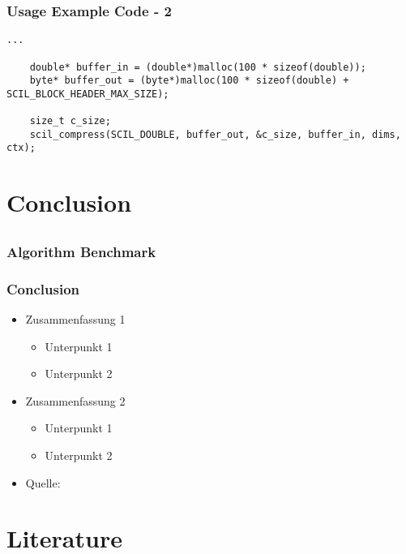 \documentclass[compress]{beamer}
\begin{document}
\begin{frame}[fragile]
	\frametitle{Usage Example Code - 2}

	\begin{lstlisting}[caption=SCIL usage example]
	...

	double* buffer_in = (double*)malloc(100 * sizeof(double));
	byte* buffer_out = (byte*)malloc(100 * sizeof(double) + SCIL_BLOCK_HEADER_MAX_SIZE);

	size_t c_size;
	scil_compress(SCIL_DOUBLE, buffer_out, &c_size, buffer_in, dims, ctx);
	\end{lstlisting}

\end{frame}

\section{Conclusion}
\subsection*{}

\begin{frame}
	\frametitle{Algorithm Benchmark}

\end{frame}

\begin{frame}
	\frametitle{Conclusion}

	\begin{itemize}
		\item Zusammenfassung 1
		\begin{itemize}
			\item Unterpunkt 1
			\item Unterpunkt 2
		\end{itemize}
		\item Zusammenfassung 2
		\begin{itemize}
			\item Unterpunkt 1
			\item Unterpunkt 2
		\end{itemize}
		\item Quelle: \cite{Quelle2012}
	\end{itemize}
\end{frame}

\section{Literature}
\subsection*{}
\end{document}
